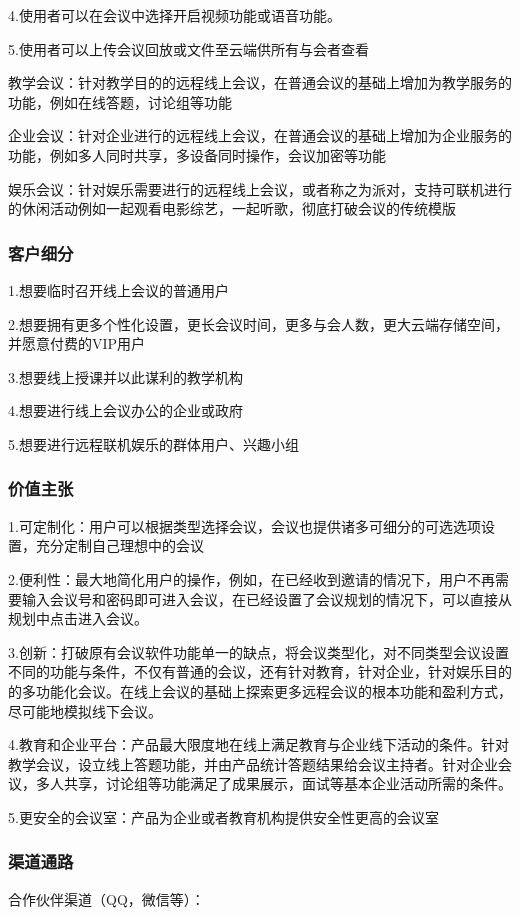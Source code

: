\documentclass[a4paper,12pt]{article}
\begin{document}
    4.使用者可以在会议中选择开启视频功能或语音功能。

    5.使用者可以上传会议回放或文件至云端供所有与会者查看

    \noindent 教学会议：针对教学目的的远程线上会议，在普通会议的基础上增加为教学服务的功能，例如在线答题，讨论组等功能

    \noindent 企业会议：针对企业进行的远程线上会议，在普通会议的基础上增加为企业服务的功能，例如多人同时共享，多设备同时操作，会议加密等功能

    \noindent 娱乐会议：针对娱乐需要进行的远程线上会议，或者称之为派对，支持可联机进行的休闲活动例如一起观看电影综艺，一起听歌，彻底打破会议的传统模版

    \subsubsection{客户细分}
    1.想要临时召开线上会议的普通用户

    2.想要拥有更多个性化设置，更长会议时间，更多与会人数，更大云端存储空间，并愿意付费的VIP用户

    3.想要线上授课并以此谋利的教学机构

    4.想要进行线上会议办公的企业或政府

    5.想要进行远程联机娱乐的群体用户、兴趣小组
    \subsubsection{价值主张}
    1.可定制化：用户可以根据类型选择会议，会议也提供诸多可细分的可选选项设置，充分定制自己理想中的会议

    2.便利性：最大地简化用户的操作，例如，在已经收到邀请的情况下，用户不再需要输入会议号和密码即可进入会议，在已经设置了会议规划的情况下，可以直接从规划中点击进入会议。

    3.创新：打破原有会议软件功能单一的缺点，将会议类型化，对不同类型会议设置不同的功能与条件，不仅有普通的会议，还有针对教育，针对企业，针对娱乐目的的多功能化会议。在线上会议的基础上探索更多远程会议的根本功能和盈利方式，尽可能地模拟线下会议。

    4.教育和企业平台：产品最大限度地在线上满足教育与企业线下活动的条件。针对教学会议，设立线上答题功能，并由产品统计答题结果给会议主持者。针对企业会议，多人共享，讨论组等功能满足了成果展示，面试等基本企业活动所需的条件。

    5.更安全的会议室：产品为企业或者教育机构提供安全性更高的会议室
    \subsubsection{渠道通路}
    合作伙伴渠道（QQ，微信等）：
\end{document}
